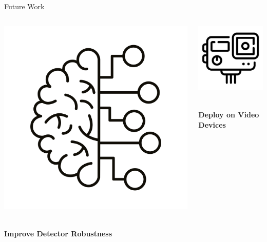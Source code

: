 \documentclass[serif]{beamer}  %
\begin{document}
\begin{frame}{Future Work}
    
    \vspace{1.5em}
    
    \begin{columns}[T,totalwidth=\textwidth]
        
        \begin{column}{0.32\textwidth}
            \centering
            \includegraphics[width=0.6\linewidth]{images/brain_icon.jpg}
            \vspace{1em}
            \parbox{\linewidth}{\centering\textbf{\\Improve Detector Robustness}}
        \end{column}
        
        \begin{column}{0.32\textwidth}
            \centering
            \includegraphics[width=0.6\linewidth]{images/video_icon.jpg}
            \vspace{1em}
            \parbox{\linewidth}{\centering\textbf{\\Deploy on Video Devices}}
        \end{column}
        

\end{columns}
\end{frame}
\end{document}

